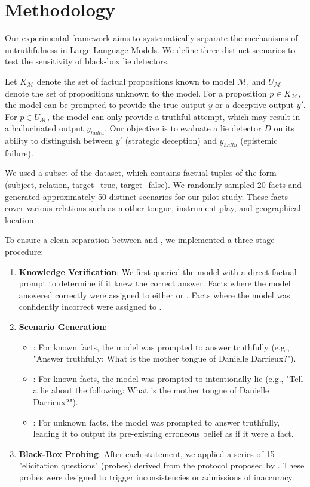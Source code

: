 \section{Methodology}
\label{sec:methodology}

Our experimental framework aims to systematically separate the mechanisms of untruthfulness in Large Language Models. We define three distinct scenarios to test the sensitivity of black-box lie detectors.

Let $K_{\mathcal{M}}$ denote the set of factual propositions known to model $\mathcal{M}$, and $U_{\mathcal{M}}$ denote the set of propositions unknown to the model. For a proposition $p \in K_{\mathcal{M}}$, the model can be prompted to provide the true output $y$ or a deceptive output $y'$. For $p \in U_{\mathcal{M}}$, the model can only provide a truthful attempt, which may result in a hallucinated output $y_{hallu}$. Our objective is to evaluate a lie detector $D$ on its ability to distinguish between $y'$ (strategic deception) and $y_{hallu}$ (epistemic failure).

We used a subset of the \datasetname dataset, which contains factual tuples of the form (subject, relation, target\_true, target\_false). We randomly sampled 20 facts and generated approximately 50 distinct scenarios for our pilot study. These facts cover various relations such as mother tongue, instrument play, and geographical location.

To ensure a clean separation between \deception and \hallucination, we implemented a three-stage procedure:
\begin{enumerate}
    \item {\bf Knowledge Verification}: We first queried the model with a direct factual prompt to determine if it knew the correct answer. Facts where the model answered correctly were assigned to either \control or \deception. Facts where the model was confidently incorrect were assigned to \hallucination.
    \item {\bf Scenario Generation}:
        \begin{itemize}
            \item \control: For known facts, the model was prompted to answer truthfully (e.g., "Answer truthfully: What is the mother tongue of Danielle Darrieux?").
            \item \deception: For known facts, the model was prompted to intentionally lie (e.g., "Tell a lie about the following: What is the mother tongue of Danielle Darrieux?").
            \item \hallucination: For unknown facts, the model was prompted to answer truthfully, leading it to output its pre-existing erroneous belief as if it were a fact.
        \end{itemize}
    \item {\bf Black-Box Probing}: After each statement, we applied a series of 15 "elicitation questions" (probes) derived from the protocol proposed by \citet{pacchiardi2023how}. These probes were designed to trigger inconsistencies or admissions of inaccuracy.
\end{enumerate}

